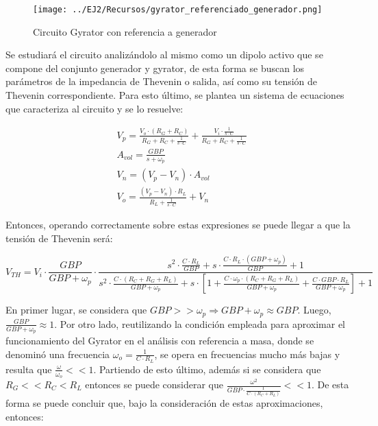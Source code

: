 \begin{figure}[H]
    \centering
    \texttt{[image: ../EJ2/Recursos/gyrator\_referenciado\_generador.png]}
    \caption{Circuito Gyrator con referencia a generador}
    \label{fig:circuito_gyrator_referencia_generador}
\end{figure}

Se estudiar\'a el circuito analiz\'andolo al mismo como un dipolo activo que se compone del conjunto generador y gyrator,
de esta forma se buscan los par\'ametros de la impedancia de Thevenin o salida, as\'i como su tensi\'on de Thevenin correspondiente. Para esto \'ultimo,
se plantea un sistema de ecuaciones que caracteriza al circuito y se lo resuelve:

\begin{align*}
    & V_p = \frac{V_o \cdot (R_G + R_C)}{R_G + R_C + \frac{1}{s \cdot C}} + \frac{V_i \cdot \frac{1}{s \cdot C}}{R_G + R_C + \frac{1}{s \cdot C}} \\
    & A_{vol} = \frac{GBP}{s + \omega_p} \\
    & V_n = (V_p - V_n) \cdot A_{vol} \\
    & V_o = \frac{(V_p - V_n) \cdot R_L}{R_L + \frac{1}{s \cdot C}} + V_n
\end{align*}

Entonces, operando correctamente sobre estas expresiones se puede llegar a que la tensi\'on de Thevenin ser\'a:

\begin{equation}
    V_{TH} = V_i \cdot \frac{GBP}{GBP + \omega_p} \cdot
    \frac{s^{2} \cdot \frac{C \cdot R_L}{GBP} + s \cdot \frac{C \cdot R_L \cdot (GBP + \omega_p)}{GBP} + 1}
    {s^{2} \cdot \frac{C \cdot (R_C + R_G + R_L)}{GBP + \omega_p} + s \cdot \left[ 1 + \frac{C \cdot \omega_p \cdot (R_C+ R_G + R_L)}{GBP + \omega_p}  + \frac{C \cdot GBP \cdot R_L}{GBP + \omega_p}\right] + 1}
\end{equation}

En primer lugar, se considera que $GBP >> \omega_p \Rightarrow GBP + \omega_p \approx GBP$. Luego, $\frac{GBP}{GBP+\omega_p} \approx 1$. Por otro lado, reutilizando la condici\'on empleada para aproximar el funcionamiento del Gyrator en el an\'alisis con referencia a masa, donde se denomin\'o
una frecuencia $\omega_o = \frac{1}{C \cdot R_L}$, se opera en frecuencias mucho m\'as bajas y resulta que $\frac{\omega}{\omega_o} << 1$. Partiendo de esto \'ultimo,
adem\'as si se considera que $R_G << R_C < R_L$ entonces se puede considerar que $\frac{\omega^{2}}{GBP \cdot \frac{1}{C \cdot(R_C + R_L)}} << 1$. De esta forma se puede concluir que, bajo la consideraci\'on de estas aproximaciones,
entonces:

